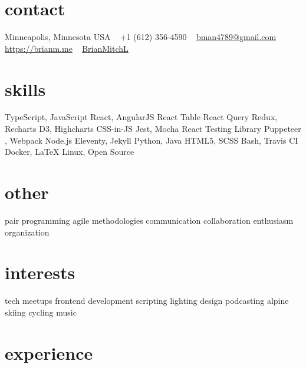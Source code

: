 \documentclass[]{cv-style} %
\begin{document}
\lastupdated


\begin{aside} %
\section{contact}
\small{Minneapolis, Minnesota USA}
~
+1 (612) 356-4590
~
\href{mailto:bman4789@gmail.com}{bman4789@gmail.com}
~
\href{https://brianm.me}{https://brianm.me}
~
\href{https://github.com/BrianMitchL}{\textcolor{headercolor}{ }BrianMitchL}
\section{skills}
TypeScript, JavaScript
React, AngularJS
React Table
React Query
Redux, Recharts
D3, Highcharts
CSS-in-JS
Jest, Mocha
React Testing Library
Puppeteer
, Webpack
Node.js
Eleventy, Jekyll
Python, Java
HTML5, SCSS
Bash, Travis CI
Docker, \LaTeX
Linux, Open Source
\section{other}
pair programming
agile methodologies
communication
collaboration
enthusiasm
organization
\section{interests}
tech meetups
frontend development
scripting
lighting design
podcasting
alpine skiing
cycling
music
\end{aside}



\section{experience}

%
%
%
%
\end{document}
